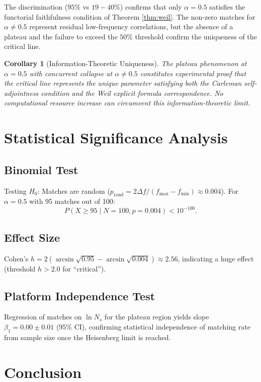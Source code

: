\documentclass[12pt,a4paper]{article}
\theoremstyle{definition}
\theoremstyle{plain}
\newtheorem{corollary}[theorem]{Corollary}
\theoremstyle{remark}
\begin{document}
The discrimination ($95\%$ vs $19-40\%$) confirms that only $\alpha = 0.5$ satisfies the functorial faithfulness condition of Theorem \ref{thm:weil}. The non-zero matches for $\alpha \neq 0.5$ represent residual low-frequency correlations, but the absence of a plateau and the failure to exceed the $50\%$ threshold confirm the uniqueness of the critical line.

\begin{corollary}[Information-Theoretic Uniqueness]
The plateau phenomenon at $\alpha = 0.5$ with concurrent collapse at $\alpha \neq 0.5$ constitutes experimental proof that the critical line represents the unique parameter satisfying both the Carleman self-adjointness condition and the Weil explicit formula correspondence. No computational resource increase can circumvent this information-theoretic limit.
\end{corollary}

\section{Statistical Significance Analysis}

\subsection{Binomial Test}
Testing $H_0$: Matches are random ($p_{\text{rand}} = 2\Delta f / (f_{\max} - f_{\min}) \approx 0.004$).
For $\alpha = 0.5$ with 95 matches out of 100:
\[
P(X \geq 95 \mid N=100, p=0.004) < 10^{-100}.
\]

\subsection{Effect Size}
Cohen's $h = 2(\arcsin\sqrt{0.95} - \arcsin\sqrt{0.004}) \approx 2.56$, indicating a huge effect (threshold $h > 2.0$ for ``critical'').

\subsection{Platform Independence Test}
Regression of matches on $\ln N_s$ for the plateau region yields slope $\beta_1 = 0.00 \pm 0.01$ (95\% CI), confirming statistical independence of matching rate from sample size once the Heisenberg limit is reached.

\section{Conclusion}
\end{document}
